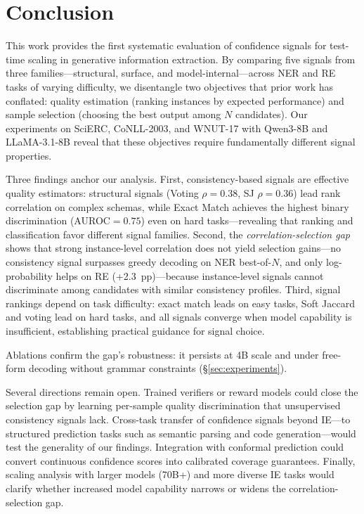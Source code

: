 \section{Conclusion}\label{sec:conclusion}

This work provides the first systematic evaluation of confidence signals for test-time scaling in generative information extraction.
By comparing five signals from three families---structural, surface, and model-internal---across NER and RE tasks of varying difficulty, we disentangle two objectives that prior work has conflated: quality estimation (ranking instances by expected performance) and sample selection (choosing the best output among $N$ candidates).
Our experiments on SciERC, CoNLL-2003, and WNUT-17 with Qwen3-8B and LLaMA-3.1-8B reveal that these objectives require fundamentally different signal properties.

Three findings anchor our analysis.
First, consistency-based signals are effective quality estimators: structural signals (Voting $\rho{=}0.38$, SJ $\rho{=}0.36$) lead rank correlation on complex schemas, while Exact Match achieves the highest binary discrimination (AUROC${=}0.75$) even on hard tasks---revealing that ranking and classification favor different signal families.
Second, the \textit{correlation-selection gap} shows that strong instance-level correlation does not yield selection gains---no consistency signal surpasses greedy decoding on NER best-of-$N$, and only log-probability helps on RE (+2.3~pp)---because instance-level signals cannot discriminate among candidates with similar consistency profiles.
Third, signal rankings depend on task difficulty: exact match leads on easy tasks, Soft Jaccard and voting lead on hard tasks, and all signals converge when model capability is insufficient, establishing practical guidance for signal choice.

Ablations confirm the gap's robustness: it persists at 4B scale and under free-form decoding without grammar constraints (\S\ref{sec:experiments}).

Several directions remain open.
Trained verifiers or reward models could close the selection gap by learning per-sample quality discrimination that unsupervised consistency signals lack.
Cross-task transfer of confidence signals beyond IE---to structured prediction tasks such as semantic parsing and code generation---would test the generality of our findings.
Integration with conformal prediction could convert continuous confidence scores into calibrated coverage guarantees.
Finally, scaling analysis with larger models (70B+) and more diverse IE tasks would clarify whether increased model capability narrows or widens the correlation-selection gap.
